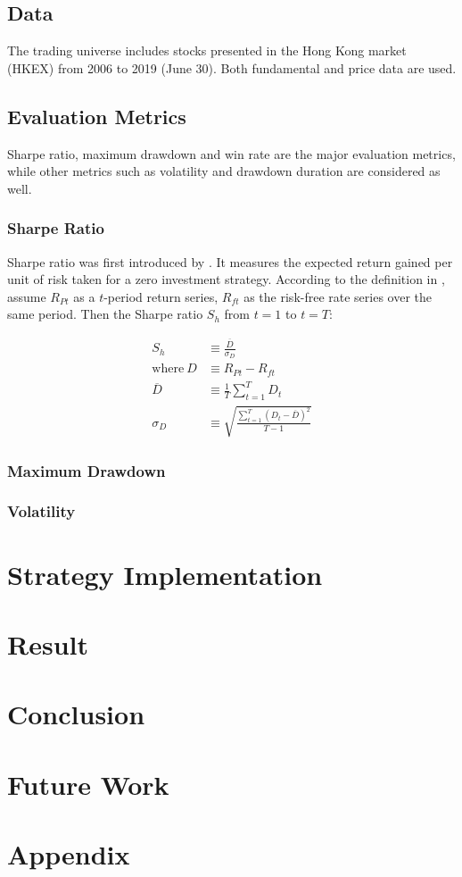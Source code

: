 \documentclass[12pt]{article}
\begin{document}
\subsection{Data}

The trading universe includes stocks presented in the Hong Kong market (HKEX) from 2006 to 2019 (June 30). Both fundamental and price data are used.

\subsection{Evaluation Metrics}

Sharpe ratio, maximum drawdown and win rate are the major evaluation metrics, while other metrics such as volatility and drawdown duration are considered as well.

\subsubsection{Sharpe Ratio}

Sharpe ratio was first introduced by \cite{sharpe1966}. It measures the expected return gained per unit of risk taken for a zero investment strategy. According to the definition in \cite{sharpe1994}, assume \(R_{Pt}\) as a \(t\)-period return series, \(R_{ft}\) as the risk-free rate series over the same period. Then the Sharpe ratio \(S_h\) from \(t=1\) to \(t=T\):

\begin{align*}
  S_h &\equiv \frac{\overline{D}}{\sigma_D} \\
  \text{where}~D &\equiv R_{Pt} - R_{ft} \\
  \overline{D} &\equiv \frac{1}{T} \sum_{t=1}^T D_t \\
  \sigma_D &\equiv \sqrt{\frac{\sum_{t=1}^T (D_t-\overline{D})^2}{T-1}}
\end{align*}

\subsubsection{Maximum Drawdown}

\subsubsection{Volatility}

\section{Strategy Implementation}

\section{Result}

\section{Conclusion}

\section{Future Work}

\section{Appendix}

\renewcommand{\refname}{Reference} %
\printbibliography
\end{document}
